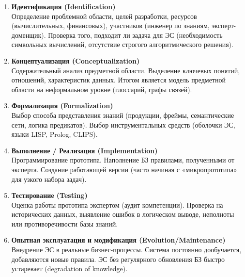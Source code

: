 \documentclass[12pt,a4paper]{article}
\begin{document}
\begin{enumerate}
    \item \textbf{Идентификация (Identification)} \\
    Определение проблемной области, целей разработки, ресурсов (вычислительных, финансовых), участников (инженер по знаниям, эксперт-доменщик). Проверка того, подходит ли задача для ЭС (необходимость символьных вычислений, отсутствие строгого алгоритмического решения).

    \item \textbf{Концептуализация (Conceptualization)} \\
    Содержательный анализ предметной области. Выделение ключевых понятий, отношений, характеристик данных. Итогом является модель предметной области на неформальном уровне (глоссарий, графы связей).

    \item \textbf{Формализация (Formalization)} \\
    Выбор способа представления знаний (продукции, фреймы, семантические сети, логика предикатов). Выбор инструментальных средств (оболочки ЭС, языки LISP, Prolog, CLIPS).

    \item \textbf{Выполнение / Реализация (Implementation)} \\
    Программирование прототипа. Наполнение БЗ правилами, полученными от эксперта. Создание работающей версии (часто начиная с «микропрототипа» для узкого набора задач).

    \item \textbf{Тестирование (Testing)} \\
    Оценка работы прототипа экспертом (аудит компетенции). Проверка на исторических данных, выявление ошибок в логическом выводе, неполноты или противоречивости базы знаний.

    \item \textbf{Опытная эксплуатация и модификация (Evolution/Maintenance)} \\
    Внедрение ЭС в реальные бизнес-процессы. Система постоянно дообучается, добавляются новые правила. ЭС без регулярного обновления БЗ быстро устаревает (degradation of knowledge).
\end{enumerate}
\end{document}
